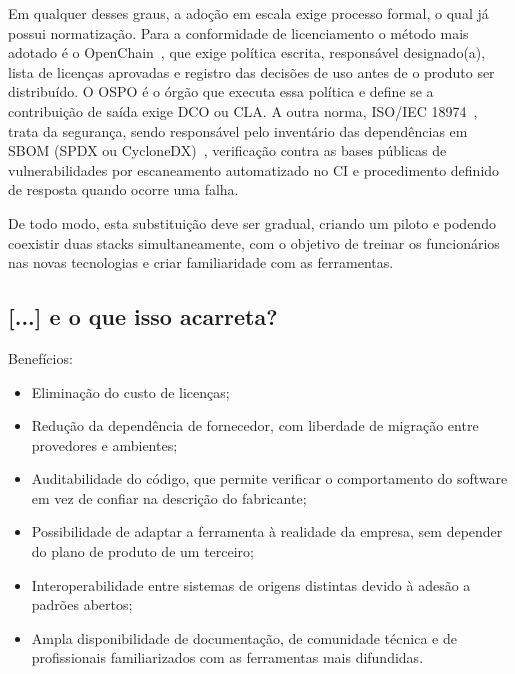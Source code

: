 Em qualquer desses graus, a adoção em escala exige processo formal, o qual já possui normatização. Para a conformidade de licenciamento o método mais adotado é o OpenChain~\cite{openchain5230}, que exige política escrita, responsável designado(a), lista de licenças aprovadas e registro das decisões de uso antes de o produto ser distribuído. O OSPO é o órgão que executa essa política e define se a contribuição de saída exige DCO ou CLA. A outra norma, ISO/IEC 18974~\cite{openchain18974}, trata da segurança, sendo responsável pelo inventário das dependências em SBOM (SPDX ou CycloneDX)~\cite{sbom}, verificação contra as bases públicas de vulnerabilidades por escaneamento automatizado no CI e procedimento definido de resposta quando ocorre uma falha.

De todo modo, esta substituição deve ser gradual, criando um piloto e podendo coexistir duas stacks simultaneamente, com o objetivo de treinar os funcionários nas novas tecnologias e criar familiaridade com as ferramentas.

\subsection{[...] e o que isso acarreta?}
\label{q3-3}

Benefícios:
\begin{itemize}
	\item Eliminação do custo de licenças;
	\item Redução da dependência de fornecedor, com liberdade de migração entre provedores e ambientes;
	\item Auditabilidade do código, que permite verificar o comportamento do software em vez de confiar na descrição do fabricante;
	\item Possibilidade de adaptar a ferramenta à realidade da empresa, sem depender do plano de produto de um terceiro;
	\item Interoperabilidade entre sistemas de origens distintas devido à adesão a padrões abertos;
	\item Ampla disponibilidade de documentação, de comunidade técnica e de profissionais familiarizados com as ferramentas mais difundidas.
\end{itemize}

